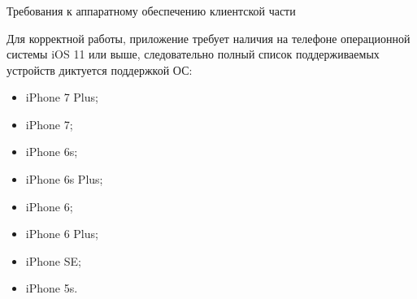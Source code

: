 \subsubsection{} Требования к аппаратному обеспечению клиентской части
\label{sec:analysis:research:req:client_requirments}

Для корректной работы, приложение требует наличия на телефоне операционной системы iOS 11 или выше, следовательно полный список поддерживаемых устройств диктуется поддержкой ОС:
\begin{itemize}
	\item iPhone 7 Plus;
	\item iPhone 7;
	\item iPhone 6s;
	\item iPhone 6s Plus;
	\item iPhone 6;
	\item iPhone 6 Plus;
	\item iPhone SE;
	\item iPhone 5s.
\end{itemize}